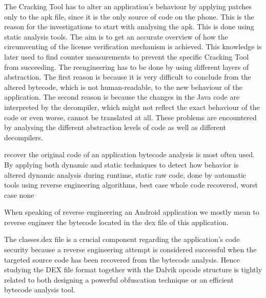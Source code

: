 The Cracking Tool has to alter an application's behaviour by applying patches only to the \gls{apk} file, since it is the only source of code on the phone. This is the reason for the investigations to start with analysing the \gls{apk}. This is done using static analysis tools. The aim is to get an accurate overview of how the circumventing of the license verification mechanism is achieved. This knowledge is later used to find counter measurements to prevent the specific Cracking Tool from succeeding.\newline
The reengineering has to be done by using different layers of abstraction. The first reason is because it is very difficult to conclude from the altered bytecode, which is not human-readable, to the new behaviour of the application. The second reason is because the changes in the Java code are interpreted by the decompiler, which might not reflect the exact behaviour of the code or even worse, cannot be translated at all.\newline
These problems are encountered by analysing the different abstraction levels of code as well as different decompilers.

%
recover the original code of an application bytecode analysis is most
often used. By applying both dynamic and static techniques to detect how behavior is altered\newline
dynamic analysis during runtime, static raw code, done by automatic tools using reverse engineering algorithms, best case whole code recovered, worst case none

When speaking of reverse engineering an Android application we mostly mean to reverse engineer the bytecode located in the dex file of this application.

The classes.dex file is a crucial component regarding the application’s code security because a reverse engineering attempt is considered successful when the targeted source code has been recovered from the bytecode analysis. Hence studying the DEX file format together with the Dalvik opcode structure is tightly related to both designing a powerful obfuscation technique or an efficient bytecode analysis tool.


\cite{kovachevaMaster}
%

